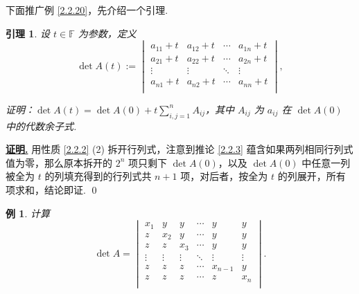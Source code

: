 \documentclass[10pt,openany]{article}
\theoremstyle{thmstyle} %
\theoremstyle{defstyle} %
\newtheorem{lemma}[theorem]{引理}
\theoremstyle{prostyle} %
\theoremstyle{exastyle}
\newtheorem{example}[theorem]{例}
\theoremstyle{remstyle}
\renewenvironment{proof}[1][证明]{\par\underline{\textbf{#1.}} \;\fangsong}{\qed\par}
\newcommand{\F}{\mathbb{F}}
\begin{document}
下面推广例 \ref{2.2.20}，先介绍一个引理.

\begin{lemma}\label{2.2.21}
    设 \( t \in \F \) 为参数，定义
    \[ \det A(t):= \begin{vmatrix}
    	a_{11} + t & a_{12} + t & \cdots & a_{1n} + t \\
    	a_{21} + t & a_{22} + t & \cdots & a_{2n} + t \\
    	\vdots & \vdots & \ddots & \vdots \\
    	a_{n1} + t & a_{n2} + t & \cdots & a_{nn} + t \\
    \end{vmatrix}, \]
    
    证明：\( \det A(t) = \det A(0) + t \sum_{i,j=1}^{n} A_{ij} \)，其中 \( A_{ij} \) 为 \( a_{ij} \) 在 \( \det A(0) \) 中的代数余子式.
    
\end{lemma}

\begin{proof}
	用性质 \ref{2.2.2} (2) 拆开行列式，注意到推论 \ref{2.2.3} 蕴含如果两列相同行列式值为零，那么原本拆开的 \( 2^n \) 项只剩下 \( \det A(0) \)，以及 \( \det A(0) \) 中任意一列被全为 \( t \) 的列填充得到的行列式共 \( n+1 \) 项，对后者，按全为 \( t \) 的列展开，所有项求和，结论即证.
\end{proof}

\begin{example}
	计算 
	\[
	\det A= 
	\begin{vmatrix}
		x_1 & y & y & \cdots & y & y \\
		z & x_2 & y & \cdots & y & y \\
		z & z & x_3 & \cdots & y & y \\
		\vdots & \vdots & \vdots & \ddots & \vdots & \vdots \\
		z & z & z & \cdots & x_{n-1} & y \\
		z & z & z & \cdots & z & x_n \\
	\end{vmatrix}.
	\]
	
\end{example}
\end{document}
